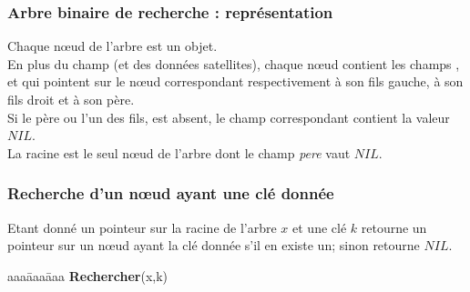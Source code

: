 \begin{frame} \frametitle{Arbre binaire de recherche : représentation}
Chaque n{\oe}ud de l'arbre est un objet.\\ En plus du champ  (et des données satellites), chaque n{\oe}ud contient les champs ,  et 
qui pointent sur le n{\oe}ud correspondant respectivement à son fils gauche, à son fils droit et à son père. 
\\ Si le père ou l'un des fils, est absent, le champ correspondant contient la valeur $NIL$. \\
La racine est le seul n{\oe}ud de l'arbre dont le champ \emph{pere} vaut $NIL$.
\end{frame}

\begin{frame}
\frametitle{Recherche d'un n{\oe}ud ayant une clé donnée}
Etant donné un pointeur sur la racine de l'arbre $x$ et une clé $k$ retourne un pointeur sur un n{\oe}ud ayant la clé donnée s'il en existe un; sinon retourne $NIL$.\\
   \begin{tabbing}
    aaa\=aaa\=aaa\kill
    \textbf{Rechercher}(x,k) \\
 \end{tabbing}
\end{frame}

